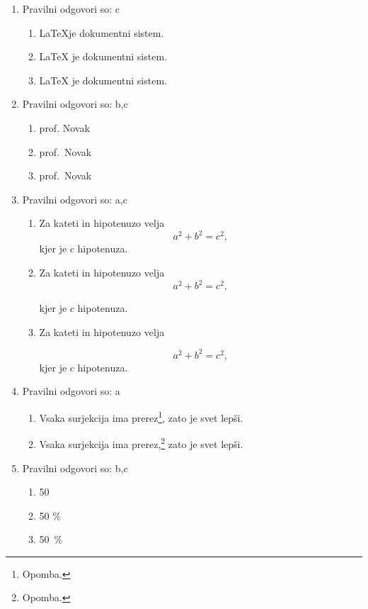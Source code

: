 \documentclass[11pt]{article}
\begin{document}
\begin{enumerate}
    \item Pravilni odgovori so: c%
    \begin{enumerate}
        \item \LaTeX je dokumentni sistem.
        \item {\LaTeX} je dokumentni sistem.
        \item \LaTeX{} je dokumentni sistem.
    \end{enumerate}

    \item Pravilni odgovori so: b,c%
    \begin{enumerate}
        \item prof. Novak
        \item prof.~Novak
        \item prof.\ Novak
    \end{enumerate}

    \item Pravilni odgovori so: a,c%
    \begin{enumerate}
        \item
Za kateti in hipotenuzo velja
\[
  a^2 + b^2 = c^2,
\]
kjer je \(c\) hipotenuza.
        \item
Za kateti in hipotenuzo velja
\[
  a^2 + b^2 = c^2,
\]

kjer je \(c\) hipotenuza.
        \item
Za kateti in hipotenuzo velja

\[
  a^2 + b^2 = c^2,
\]
kjer je \(c\) hipotenuza.
    \end{enumerate}

    \item Pravilni odgovori so: a%
    \begin{enumerate}
        \item Vsaka surjekcija ima prerez\footnote{Opomba.}, zato je svet lepši.
        \item Vsaka surjekcija ima prerez,\footnote{Opomba.} zato je svet lepši.
    \end{enumerate}

    \item Pravilni odgovori so: b,c%
    \begin{enumerate}
        \item 50 %
        \item 50 \%
        \item 50~\%
    \end{enumerate}


\end{enumerate}
\end{document}
